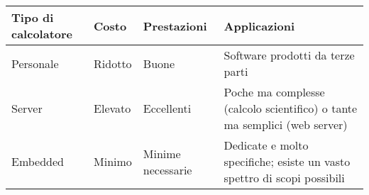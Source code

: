 \documentclass{standalone}
\begin{document}
\begin{tabular}{ p{3.5cm}p{1.5cm}p{2cm}p{4cm} }
	\toprule
		Tipo di calcolatore & Costo & Prestazioni & Applicazioni\\
	\midrule
		Personale & Ridotto & Buone & Software prodotti da terze parti\\\hline
		Server & Elevato & Eccellenti & Poche ma complesse (calcolo scientifico) o tante ma semplici (web server)\\\hline
		Embedded & Minimo & Minime necessarie & Dedicate e molto specifiche; esiste un vasto spettro di scopi possibili\\
	\bottomrule
\end{tabular}
\end{document}
